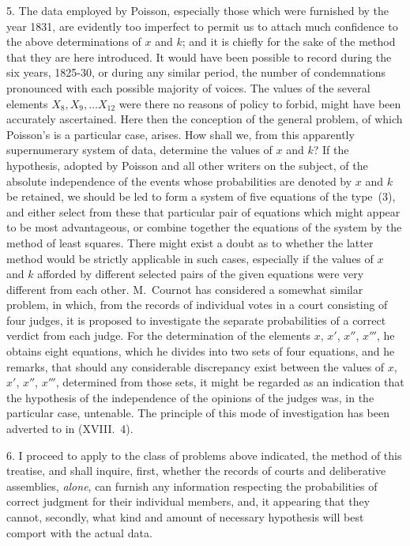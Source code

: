 \documentclass[oneside]{book}
\begin{document}
5. The data employed by Poisson, especially those which were
furnished by the year 1831, are evidently too imperfect to permit
us to attach much confidence to the above determinations of $x$ and
$k$; and it is chiefly for the sake of the method that they are here
introduced. It would have been possible to record during the
six years, 1825-30, or during any similar period, the number of
condemnations pronounced with each possible majority of voices.
The values of the several elements $X_8, X_9, \dotsc X_{12}$ were there
no reasons of policy to forbid, might have been accurately ascertained. Here then the conception of the general problem, of
which Poisson's is a particular case, arises. How shall we, from
this apparently supernumerary system of data, determine the
values of $x$ and $k$? If the hypothesis, adopted by Poisson and
all other writers on the subject, of the absolute independence of
the events whose probabilities are denoted by $x$ and $k$ be retained,
we should be led to form a system of five equations of the type~(3),
and either select from these that particular pair of equations which
might appear to be most advantageous, or combine together the
equations of the system by the method of least squares. There
might exist a doubt as to whether the latter method would be
strictly applicable in such cases, especially if the values of $x$ and $k$
afforded by different selected pairs of the given equations were very
different from each other. M.~Cournot has considered a somewhat
similar problem, in which, from the records of individual votes in
a court consisting of four judges, it is proposed to investigate the
separate probabilities of a correct verdict from each judge. For
the determination of the elements $x$, $x'$, $x''$, $x'''$, he obtains eight
equations, which he divides into two sets of four equations, and
he remarks, that should any considerable discrepancy exist between the values of $x$, $x'$, $x''$, $x'''$, determined from those sets, it
might be regarded as an indication that the hypothesis of the independence of the opinions of the judges was, in the particular
case, untenable. The principle of this mode of investigation has
been adverted to in (XVIII.~4).

6. I proceed to apply to the class of problems above indicated,
the method of this treatise, and shall inquire, first, whether the
records of courts and deliberative assemblies, \emph{alone}, can furnish
any information respecting the probabilities of correct judgment
for their individual members, and, it appearing that they cannot,
secondly, what kind and amount of necessary hypothesis will best
comport with the actual data.
\end{document}
